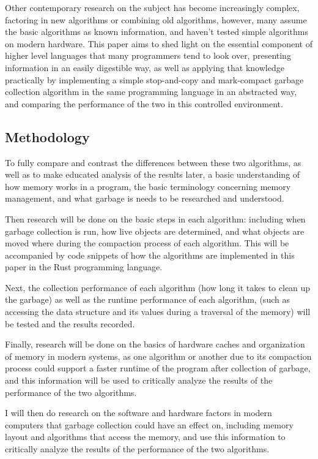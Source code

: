 \documentclass[index]{subfiles}
\begin{document}
Other contemporary research on the subject has become increasingly complex, factoring in new algorithms or combining old algorithms, however, many assume the basic algorithms as known information, and haven't tested simple algorithms on modern hardware. This paper aims to shed light on the essential component of higher level languages that many programmers tend to look over, presenting information in an easily digestible way, as well as applying that knowledge practically by implementing a simple stop-and-copy and mark-compact garbage collection algorithm in the same programming language in an abstracted way, and comparing the performance of the two in this controlled environment.

\subsection{Methodology}

To fully compare and contrast the differences between these two algorithms, as well as to make educated analysis of the results later, a basic understanding of how memory works in a program, the basic terminology concerning memory management, and what garbage is needs to be researched and understood. 

Then research will be done on the basic steps in each algorithm: including when garbage collection is run, how live objects are determined, and what objects are moved where during the compaction process of each algorithm. This will be accompanied by code snippets of how the algorithms are implemented in this paper in the Rust programming language. 

Next, the collection performance of each algorithm (how long it takes to clean up the garbage) as well as the runtime performance of each algorithm, (such as accessing the data structure and its values during a traversal of the memory) will be tested and the results recorded.

Finally, research will be done on the basics of hardware caches and organization of memory in modern systems, as one algorithm or another due to its compaction process could support a faster runtime of the program after collection of garbage, and this information will be used to critically analyze the results of the performance of the two algorithms.

I will then do research on the software and hardware factors in modern computers that garbage collection could have an effect on, including memory layout and algorithms that access the memory, and use this information to critically analyze the results of the performance of the two algorithms.
\end{document}
